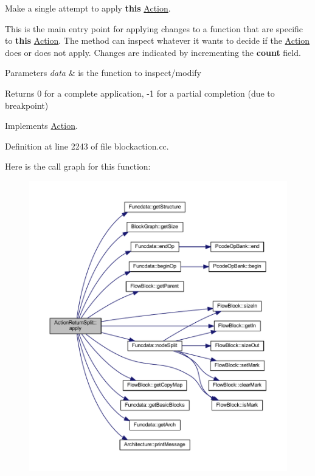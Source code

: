 Make a single attempt to apply {\bfseries{this}} \mbox{\hyperlink{class_action}{Action}}. 

This is the main entry point for applying changes to a function that are specific to {\bfseries{this}} \mbox{\hyperlink{class_action}{Action}}. The method can inspect whatever it wants to decide if the \mbox{\hyperlink{class_action}{Action}} does or does not apply. Changes are indicated by incrementing the {\bfseries{count}} field. 
\begin{DoxyParams}{Parameters}
{\em data} & is the function to inspect/modify \\
\hline
\end{DoxyParams}
\begin{DoxyReturn}{Returns}
0 for a complete application, -\/1 for a partial completion (due to breakpoint) 
\end{DoxyReturn}


Implements \mbox{\hyperlink{class_action_aac1c3999d6c685b15f5d9765a4d04173}{Action}}.



Definition at line 2243 of file blockaction.\+cc.

Here is the call graph for this function\+:
\nopagebreak
\begin{figure}[H]
\begin{center}
\leavevmode
\includegraphics[width=350pt]{class_action_return_split_a19c3922a6dc7e8e0af6eed9becd7c01b_cgraph}
\end{center}
\end{figure}
\mbox{\label{class_action_return_split_afa7ea727f756deda567aa1f87bdfe28b}} 
